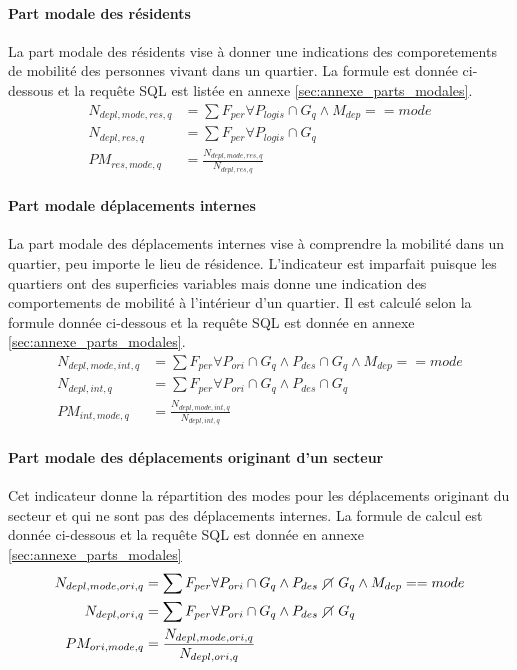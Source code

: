             \paragraph{Part modale des résidents} La part modale des résidents vise à donner une indications des comporetements de mobilité des personnes vivant dans un quartier. La formule est donnée ci-dessous et la requête SQL est listée en annexe \ref{sec:annexe_parts_modales}.
            \begin{align}
                N_{depl,mode,res,q}  &= \sum{F_{per}} \forall P_{logis} \cap G_q \wedge M_{dep} == mode\\
                N_{depl,res,q} &= \sum{F_{per}} \forall P_{logis} \cap G_q \\
                PM_{res,mode,q} &= \frac{N_{depl,mode,res,q}}{N_{depl,res,q}}
            \end{align}
            \paragraph{Part modale déplacements internes} La part modale des déplacements internes vise à comprendre la mobilité dans un quartier, peu importe le lieu de résidence. L'indicateur est imparfait puisque les quartiers ont des superficies variables mais donne une indication des comportements de mobilité à l'intérieur d'un quartier. Il est calculé selon la formule donnée ci-dessous et la requête SQL est donnée en annexe \ref{sec:annexe_parts_modales}.
            \begin{align}
                N_{depl,mode,int,q} &= \sum{F_{per}} \forall P_{ori} \cap G_q \wedge P_{des} \cap G_q \wedge M_{dep}==mode \\
                N_{depl,int,q} &= \sum{F_{per}} \forall P_{ori} \cap G_q \wedge P_{des} \cap G_q \\
                PM_{int,mode,q} &= \frac{N_{depl,mode,int,q}}{N_{depl,int,q}}
            \end{align}
            \paragraph{Part modale des déplacements originant d'un secteur} Cet indicateur donne la répartition des modes pour les déplacements originant du secteur et qui ne sont pas des déplacements internes. La formule de calcul est donnée ci-dessous et la requête SQL est donnée en annexe \ref{sec:annexe_parts_modales}
            \begin{align}
                N_{depl,mode,ori,q} &= \sum{F_{per}} \forall P_{ori} \cap G_q \wedge P_{des} \disjoint G_q \wedge M_{dep}==mode \\
                N_{depl,ori,q} &= \sum{F_{per}} \forall P_{ori} \cap G_q \wedge P_{des} \disjoint G_q \\
                PM_{ori,mode,q} &= \frac{N_{depl,mode,ori,q}}{N_{depl,ori,q}}
            \end{align}
